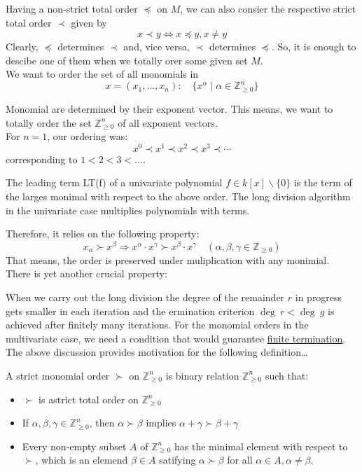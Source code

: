 Having a non-strict total order $\preccurlyeq$ on $M$, we can also consier the respective strict total order $\prec$ given by 
\[x \prec y \Leftrightarrow x \preccurlyeq y, x \neq y\]
Clearly, $\preccurlyeq$ determines $\prec$ and, vice versa, $\prec$ determines $\preccurlyeq$. So, it is enough to descibe one of them when we totally orer some given set $M$. \\

We want to order the set of all monomials in \[x = (x_1, \ldots, x_n): \quad \{x^{\alpha} \mid \alpha \in \mathbb{Z}^n_{\geq 0}\}\] 

Monomial are determined by their exponent vector. This means, we want to totally order the set $\mathbb{Z}^n_{\geq 0}$ of all exponent vectors. \\[0.3em] 
For $n = 1$, our ordering was: 
\[x^0 \prec x^1 \prec x^2 \prec x^3 \prec \cdots\]
corresponding to $1 < 2< 3< \dots$. 

The leading term LT(f) of a univariate polynomial $f \in k[x]\backslash\{0\}$ is the term of the larges monimal with respect to the above order. The long division algorithm 
in the univariate case multiplies polynomials with terms. 

Therefore, it relies on the following property: \[x_{\alpha} \succ x^{\beta} \Rightarrow x^{\alpha} \cdot x^{\gamma} \succ x^{ \beta} \cdot x^{\gamma} \quad ( \alpha, \beta, \gamma \in \mathbb{Z}_{\geq 0}) \] 
That means, the order is preserved under muliplication with any monimial. \\[0.3em]
There is yet another crucial property: 

When we carry out the long division the degree of the remainder $r$ in progress gets smaller in each iteration and the ermination criterion $\deg \ r < \deg \ g$ is 
achieved after finitely many iterations. For the monomial orders in the multivariate case, we need a condition that would guarantee \underline{finite termination}.
The above discussion provides motivation for the following definition\dots


\begin{definition}[title = Definition 2.1.2]
    A strict monomial order $\succ$ on $\mathbb{Z}^n_{\geq 0}$ is binary relation $\mathbb{Z}^n_{\geq 0}$ such that: 
    \begin{itemize}
      \item[(i)] $\succ$ is astrict total order on $\mathbb{Z}^n_{\geq 0}$ 
      \item[(ii)] If $\alpha, \beta, \gamma \in \mathbb{Z}^n_{\geq 0}$, then $\alpha \succ \beta$ implies $\alpha + \gamma \succ \beta + \gamma$  
      \item[(iii)] Every non-empty subset  $A$ of $\mathbb{Z}^n_{\geq 0}$ has the minimal element with respect to $\succ$, which is an elemend $\beta \in A$ satifying $\alpha \succ \beta$ for all $\alpha \in A, \alpha \neq \beta$. 
    \end{itemize}
\end{definition}
 
